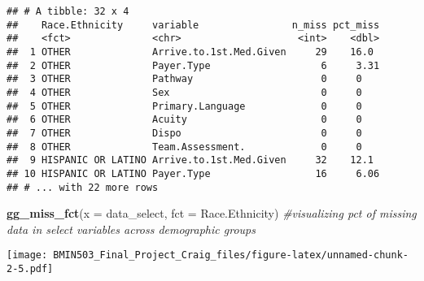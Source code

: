 \documentclass[]{article}
\newenvironment{Shaded}{\begin{snugshade}}{\end{snugshade}}
\newcommand{\KeywordTok}[1]{\textcolor[rgb]{0.13,0.29,0.53}{\textbf{#1}}}
\newcommand{\DataTypeTok}[1]{\textcolor[rgb]{0.13,0.29,0.53}{#1}}
\newcommand{\StringTok}[1]{\textcolor[rgb]{0.31,0.60,0.02}{#1}}
\newcommand{\CommentTok}[1]{\textcolor[rgb]{0.56,0.35,0.01}{\textit{#1}}}
\newcommand{\OperatorTok}[1]{\textcolor[rgb]{0.81,0.36,0.00}{\textbf{#1}}}
\newcommand{\NormalTok}[1]{#1}
\begin{document}
\begin{Shaded}
\end{Shaded}

\begin{verbatim}
## # A tibble: 32 x 4
##    Race.Ethnicity     variable                n_miss pct_miss
##    <fct>              <chr>                    <int>    <dbl>
##  1 OTHER              Arrive.to.1st.Med.Given     29    16.0 
##  2 OTHER              Payer.Type                   6     3.31
##  3 OTHER              Pathway                      0     0   
##  4 OTHER              Sex                          0     0   
##  5 OTHER              Primary.Language             0     0   
##  6 OTHER              Acuity                       0     0   
##  7 OTHER              Dispo                        0     0   
##  8 OTHER              Team.Assessment.             0     0   
##  9 HISPANIC OR LATINO Arrive.to.1st.Med.Given     32    12.1 
## 10 HISPANIC OR LATINO Payer.Type                  16     6.06
## # ... with 22 more rows
\end{verbatim}

\begin{Shaded}
\begin{Highlighting}[]
\KeywordTok{gg_miss_fct}\NormalTok{(}\DataTypeTok{x =}\NormalTok{ data_select, }\DataTypeTok{fct =}\NormalTok{ Race.Ethnicity) }\CommentTok{#visualizing pct of missing data in select variables across demographic groups}
\end{Highlighting}
\end{Shaded}

\texttt{[image: BMIN503\_Final\_Project\_Craig\_files/figure-latex/unnamed-chunk-2-5.pdf]}

\begin{Shaded}
\end{Shaded}
\end{document}
